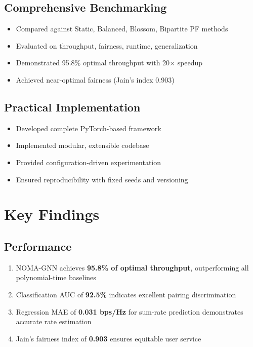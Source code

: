 \subsection{Comprehensive Benchmarking}
\begin{itemize}
    \item Compared against Static, Balanced, Blossom, Bipartite PF methods
    \item Evaluated on throughput, fairness, runtime, generalization
    \item Demonstrated 95.8\% optimal throughput with 20× speedup
    \item Achieved near-optimal fairness (Jain's index 0.903)
\end{itemize}

\subsection{Practical Implementation}
\begin{itemize}
    \item Developed complete PyTorch-based framework
    \item Implemented modular, extensible codebase
    \item Provided configuration-driven experimentation
    \item Ensured reproducibility with fixed seeds and versioning
\end{itemize}

\section{Key Findings}

\subsection{Performance}
\begin{enumerate}
    \item NOMA-GNN achieves \textbf{95.8\% of optimal throughput}, outperforming all polynomial-time baselines
    \item Classification AUC of \textbf{92.5\%} indicates excellent pairing discrimination
    \item Regression MAE of \textbf{0.031 bps/Hz} for sum-rate prediction demonstrates accurate rate estimation
    \item Jain's fairness index of \textbf{0.903} ensures equitable user service
\end{enumerate}

